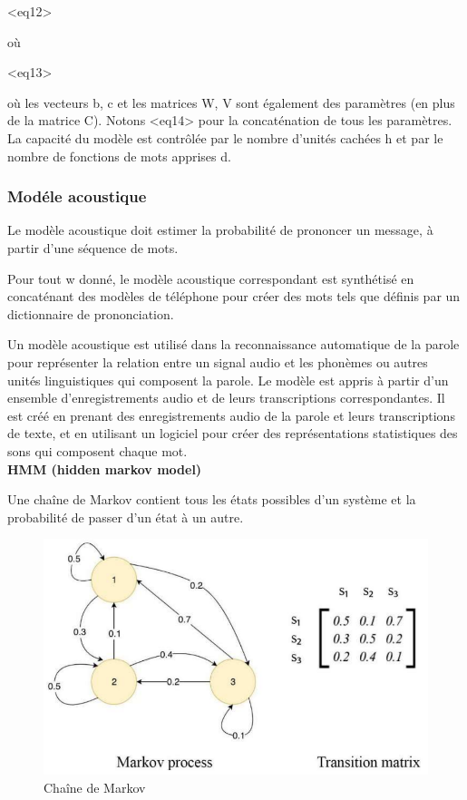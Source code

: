 \documentclass[a4paper, 12pt]{book}
\begin{document}
<eq12>

où

<eq13>

où les vecteurs b, c et les matrices W, V sont également des paramètres (en plus de la matrice C). Notons <eq14>  pour la concaténation de tous les paramètres. La capacité du modèle est contrôlée par le nombre d'unités cachées h et par le nombre de fonctions de mots apprises d.

\subsubsection{Modéle acoustique}

Le modèle acoustique doit estimer la probabilité de prononcer un message, à partir d'une séquence de mots.

Pour tout w donné, le modèle acoustique correspondant est synthétisé en concaténant des modèles de téléphone pour créer des mots tels que définis par un dictionnaire de prononciation.

Un modèle acoustique est utilisé dans la reconnaissance automatique de la parole pour représenter la relation entre un signal audio et les phonèmes ou autres unités linguistiques qui composent la parole. Le modèle est appris à partir d'un ensemble d'enregistrements audio et de leurs transcriptions correspondantes. Il est créé en prenant des enregistrements audio de la parole et leurs transcriptions de texte, et en utilisant un logiciel pour créer des représentations statistiques des sons qui composent chaque mot.\\

\textbf{HMM (hidden markov model)}

Une chaîne de Markov contient tous les états possibles d'un système et la probabilité de passer d'un état à un autre.

\begin{figure}[htbp]
  \centering
  \includegraphics[width=0.7\linewidth]{fig/markov.png}
  \caption{Chaîne de Markov}
\end{figure}
\end{document}
